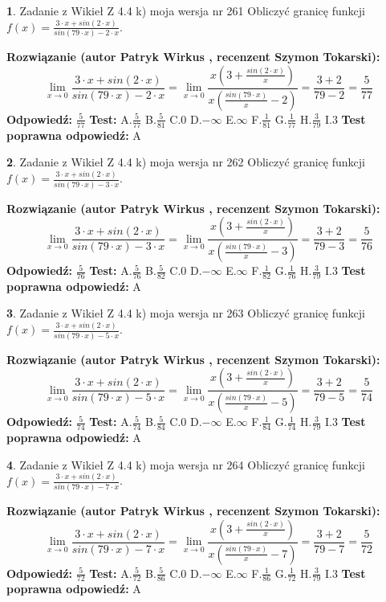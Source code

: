 \documentclass[12pt, a4paper]{article}
\theoremstyle{definition} %
\newtheorem{zad}{}
\newcommand{\zadStart}[1]{\begin{zad}#1\newline}
\newcommand{\zadStop}{\end{zad}}
\newcommand{\rozwStart}[2]{\noindent \textbf{Rozwiązanie (autor #1 , recenzent #2): }\newline}
\newcommand{\rozwStop}{\newline}
\newcommand{\odpStart}{\noindent \textbf{Odpowiedź:}\newline}
\newcommand{\odpStop}{\newline}
\newcommand{\testStart}{\noindent \textbf{Test:}\newline}
\newcommand{\testStop}{\newline}
\newcommand{\kluczStart}{\noindent \textbf{Test poprawna odpowiedź:}\newline}
\newcommand{\kluczStop}{\newline}
\begin{document}
\zadStart{Zadanie z Wikieł Z 4.4 k) moja wersja nr 261}
Obliczyć granicę funkcji $f(x)=\frac{3\cdot x +sin(2\cdot x)}{sin(79\cdot x) -2\cdot x}$.
\zadStop
\rozwStart{Patryk Wirkus}{Szymon Tokarski}
$$\lim\limits_{x\to 0}\frac{3\cdot x +sin(2\cdot x)}{sin(79\cdot x) -2\cdot x}
=\lim\limits_{x\to 0}\frac{x(3+\frac{sin(2\cdot x)}{x})}{x(\frac{sin(79\cdot x)}{x}-2)}
=\frac{3+2}{79-2} = \frac{5}{77}$$
\rozwStop
\odpStart
$\frac{5}{77}$
\odpStop
\testStart
A.$\frac{5}{77}$
B.$\frac{5}{81}$
C.$0$
D.$-\infty$
E.$\infty$
F.$\frac{1}{81}$
G.$\frac{1}{77}$
H.$\frac{3}{79}$
I.$3$
\testStop
\kluczStart
A
\kluczStop



\zadStart{Zadanie z Wikieł Z 4.4 k) moja wersja nr 262}
Obliczyć granicę funkcji $f(x)=\frac{3\cdot x +sin(2\cdot x)}{sin(79\cdot x) -3\cdot x}$.
\zadStop
\rozwStart{Patryk Wirkus}{Szymon Tokarski}
$$\lim\limits_{x\to 0}\frac{3\cdot x +sin(2\cdot x)}{sin(79\cdot x) -3\cdot x}
=\lim\limits_{x\to 0}\frac{x(3+\frac{sin(2\cdot x)}{x})}{x(\frac{sin(79\cdot x)}{x}-3)}
=\frac{3+2}{79-3} = \frac{5}{76}$$
\rozwStop
\odpStart
$\frac{5}{76}$
\odpStop
\testStart
A.$\frac{5}{76}$
B.$\frac{5}{82}$
C.$0$
D.$-\infty$
E.$\infty$
F.$\frac{1}{82}$
G.$\frac{1}{76}$
H.$\frac{3}{79}$
I.$3$
\testStop
\kluczStart
A
\kluczStop



\zadStart{Zadanie z Wikieł Z 4.4 k) moja wersja nr 263}
Obliczyć granicę funkcji $f(x)=\frac{3\cdot x +sin(2\cdot x)}{sin(79\cdot x) -5\cdot x}$.
\zadStop
\rozwStart{Patryk Wirkus}{Szymon Tokarski}
$$\lim\limits_{x\to 0}\frac{3\cdot x +sin(2\cdot x)}{sin(79\cdot x) -5\cdot x}
=\lim\limits_{x\to 0}\frac{x(3+\frac{sin(2\cdot x)}{x})}{x(\frac{sin(79\cdot x)}{x}-5)}
=\frac{3+2}{79-5} = \frac{5}{74}$$
\rozwStop
\odpStart
$\frac{5}{74}$
\odpStop
\testStart
A.$\frac{5}{74}$
B.$\frac{5}{84}$
C.$0$
D.$-\infty$
E.$\infty$
F.$\frac{1}{84}$
G.$\frac{1}{74}$
H.$\frac{3}{79}$
I.$3$
\testStop
\kluczStart
A
\kluczStop



\zadStart{Zadanie z Wikieł Z 4.4 k) moja wersja nr 264}
Obliczyć granicę funkcji $f(x)=\frac{3\cdot x +sin(2\cdot x)}{sin(79\cdot x) -7\cdot x}$.
\zadStop
\rozwStart{Patryk Wirkus}{Szymon Tokarski}
$$\lim\limits_{x\to 0}\frac{3\cdot x +sin(2\cdot x)}{sin(79\cdot x) -7\cdot x}
=\lim\limits_{x\to 0}\frac{x(3+\frac{sin(2\cdot x)}{x})}{x(\frac{sin(79\cdot x)}{x}-7)}
=\frac{3+2}{79-7} = \frac{5}{72}$$
\rozwStop
\odpStart
$\frac{5}{72}$
\odpStop
\testStart
A.$\frac{5}{72}$
B.$\frac{5}{86}$
C.$0$
D.$-\infty$
E.$\infty$
F.$\frac{1}{86}$
G.$\frac{1}{72}$
H.$\frac{3}{79}$
I.$3$
\testStop
\kluczStart
A
\kluczStop
\end{document}
